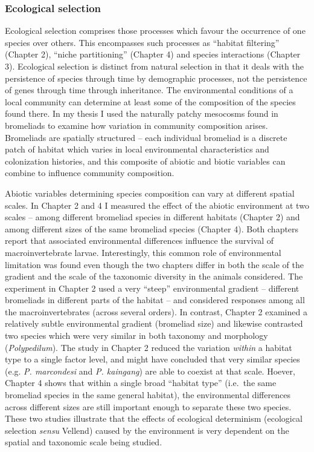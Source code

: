\subsubsection{Ecological selection}\label{ecological-selection}

Ecological selection comprises those processes which favour the
occurrence of one species over others. This encompasses such processes
as ``habitat filtering'' (Chapter 2), ``niche partitioning'' (Chapter 4)
and species interactions (Chapter 3). Ecological selection is distinct
from natural selection in that it deals with the persistence of species
through time by demographic processes, not the persistence of genes
through time through inheritance. The environmental conditions of a
local community can determine at least some of the composition of the
species found there. In my thesis I used the naturally patchy mesocosms
found in bromeliads to examine how variation in community composition
arises. Bromeliads are spatially structured -- each individual bromeliad
is a discrete patch of habitat which varies in local environmental
characteristics and colonization histories, and this composite of
abiotic and biotic variables can combine to influence community
composition.

Abiotic variables determining species composition can vary at different
spatial scales. In Chapter 2 and 4 I measured the effect of the abiotic
environment at two scales -- among different bromeliad species in
different habitats (Chapter 2) and among different sizes of the same
bromeliad species (Chapter 4). Both chapters report that associated
environmental differences influence the survival of macroinvertebrate
larvae. Interestingly, this common role of environmental limitation was
found even though the two chapters differ in both the scale of the
gradient and the scale of the taxonomic diversity in the animals
considered. The experiment in Chapter 2 used a very ``steep''
environmental gradient -- different bromeliads in different parts of the
habitat -- and considered responses among all the macroinvertebrates
(across several orders). In contrast, Chapter 2 examined a relatively
subtle environmental gradient (bromeliad size) and likewise contrasted
two species which were very similar in both taxonomy and morphology
(\emph{Polypedilum}). The study in Chapter 2 reduced the variation
\emph{within} a habitat type to a single factor level, and might have
concluded that very similar species (e.g. \emph{P. marcondesi} and
\emph{P. kaingang}) are able to coexist at that scale. Hoever, Chapter 4
shows that within a single broad ``habitat type'' (i.e.~the same
bromeliad species in the same general habitat), the environmental
differences across different sizes are still important enough to
separate these two species. These two studies illustrate that the
effects of ecological determinism (ecological selection \emph{sensu}
Vellend) caused by the environment is very dependent on the spatial and
taxonomic scale being studied.

